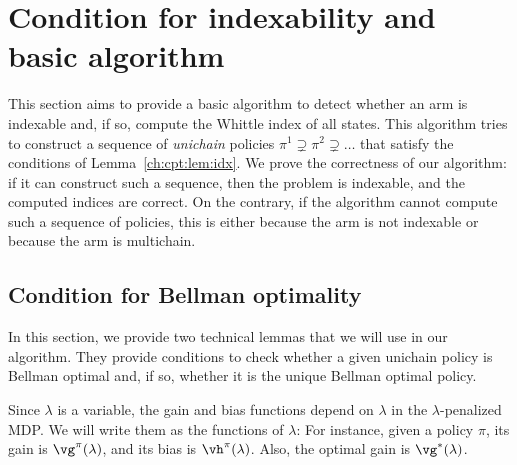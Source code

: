 \section{Condition for indexability and basic algorithm}
\label{sec:widx_compute}

This section aims to provide a basic algorithm to detect whether an arm is indexable and, if so, compute the Whittle index of all states.
This algorithm tries to construct a sequence of \emph{unichain} policies $\pi^1\supsetneq \pi^2\supsetneq\dots$ that satisfy the conditions of Lemma~\ref{ch:cpt:lem:idx}.
We prove the correctness of our algorithm: if it can construct such a sequence, then the problem is indexable, and the computed indices are correct.
On the contrary, if the algorithm cannot compute such a sequence of policies, this is either because the arm is not indexable or because the arm is multichain.

\subsection{Condition for Bellman optimality}

In this section, we provide two technical lemmas that we will use in our algorithm. %
They provide conditions to check whether a given unichain policy is Bellman optimal and, if so, whether it is the unique Bellman optimal policy.

Since $\lambda$ is a variable, the gain and bias functions depend on $\lambda$ in the $\lambda$-penalized MDP.
We will write them as the functions of $\lambda$: For instance, given a policy $\pi$, its gain is $\vg^\pi(\lambda)$, and its bias is $\vh^\pi(\lambda)$. Also, the optimal gain is $\vg^*(\lambda)$.

